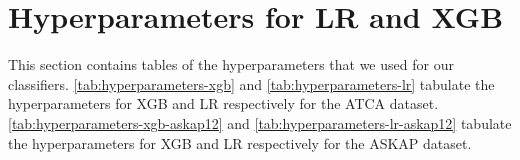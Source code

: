 

\section{Hyperparameters for LR and XGB}
\label{sec:faraday-hyperparameters}

  This section contains tables of the hyperparameters that we used for our classifiers. \autoref{tab:hyperparameters-xgb} and \autoref{tab:hyperparameters-lr} tabulate the hyperparameters for XGB and LR respectively for the ATCA dataset. \autoref{tab:hyperparameters-xgb-askap12} and \autoref{tab:hyperparameters-lr-askap12} tabulate the hyperparameters for XGB and LR respectively for the ASKAP dataset.

